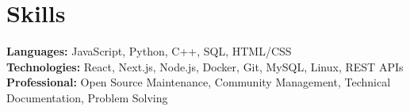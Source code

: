 \section{Skills}
\small
\begin{adjustwidth}{0.15in}{0.15in}
\textbf{Languages:} JavaScript, Python, C++, SQL, HTML/CSS \\[6pt]
\textbf{Technologies:} React, Next.js, Node.js, Docker, Git, MySQL, Linux, REST APIs \\[6pt]
\textbf{Professional:} Open Source Maintenance, Community Management, Technical Documentation, Problem Solving
\end{adjustwidth}